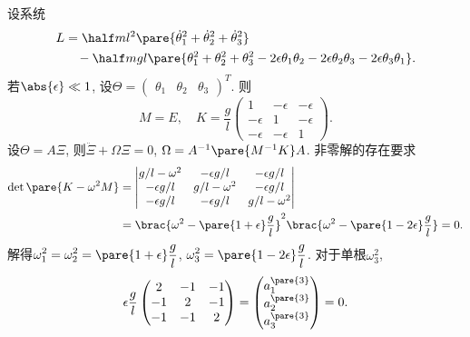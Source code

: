 \documentclass{ctexart}
\begin{document}
\begin{sample}
    \begin{ex}
        设系统
        \begin{align*}
            L &= \half ml^2 \pare{\dot{\theta}_1^2 + \dot{\theta}_2^2 + \dot{\theta}_3^2} \\ &\phantom{=}\, - \half mgl \pare{\theta_1^2 + \theta_2^2 + \theta_3^2 - 2\epsilon \theta_1\theta_2 - 2\epsilon \theta_2\theta_3 - 2\epsilon \theta_3\theta_1}.
        \end{align*}
        若$\abs{\epsilon} \ll 1$, 设$\Theta = \begin{pmatrix}
            \theta_1 & \theta_2 & \theta_3
        \end{pmatrix}^T$. 则
        \[ M = E,\quad K = \frac{g}{l} \begin{pmatrix}
            1 & -\epsilon & -\epsilon \\
            -\epsilon & 1 & -\epsilon \\
            -\epsilon & -\epsilon & 1
        \end{pmatrix}. \]
        设$\Theta = A\Xi$, 则$\ddot{\Xi} + \Omega\Xi = 0$, $\Omega = A^{-1}\pare{M^{-1}K}A$. 非零解的存在要求
        \begin{align*}
            \det\pare{K-\omega^2 M} &= \begin{vmatrix}
            g/l - \omega^2 & -\epsilon g/l & -\epsilon g/l \\
            -\epsilon g/l & g/l - \omega^2 & -\epsilon g/l \\
            -\epsilon g/l & -\epsilon g/l & g/l - \omega^2
        \end{vmatrix}\\ &= \brac{\omega^2 - \pare{1+\epsilon}\frac{g}{l}}^2 \brac{\omega^2 - \pare{1-2\epsilon}\frac{g}{l}} = 0.
        \end{align*}
        解得$\displaystyle \omega_1^2 = \omega_2^2 = \pare{1+\epsilon} \frac{g}{l}$, $\displaystyle \omega_3^2 = \pare{1-2\epsilon} \frac{g}{l}$. 对于单根$\omega_3^2$,
        \[ \epsilon \frac{g}{l} \begin{pmatrix}
            2 & -1 & -1 \\
            -1 & 2 & -1 \\
            -1 & -1 & 2
        \end{pmatrix} = \begin{pmatrix}
            a_1^{\pare{3}} \\ a_2^{\pare{3}} \\ a_3^{\pare{3}}
        \end{pmatrix} = 0. \]

\end{ex}
\end{sample}
\end{document}
